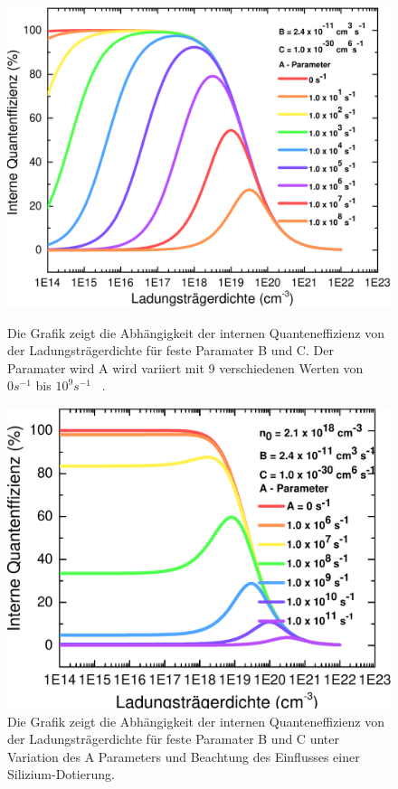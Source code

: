 \begin{figure}[tb]
    \centering
    \begin{minipage}[t]{0.49\linewidth}
        \centering
        \includegraphics[width=\linewidth]{Bilder/IQEohneDotierungVerschAParams.pdf}
        \caption{Die Grafik zeigt die Abhängigkeit der internen Quanteneffizienz von der Ladungsträgerdichte für feste Paramater B und C. Der Paramater wird A wird variiert mit 9 verschiedenen Werten von $0 s^{-1} $ bis $10^9 s^{-1}$ ~\cite{semreich}.}
        \label{fig:abha}
    \end{minipage}%
    \hfill
    \begin{minipage}[t]{0.49\linewidth}
        \centering
        \includegraphics[width=\linewidth]{Bilder/IQEmitDotierungVerschAParams.pdf}
        \caption{Die Grafik zeigt die Abhängigkeit der internen Quanteneffizienz von der Ladungsträgerdichte für feste Paramater B und C unter Variation des A Parameters und Beachtung des Einflusses einer Silizium-Dotierung.}
        \label{fig:abha1}
    \end{minipage}
\end{figure}

